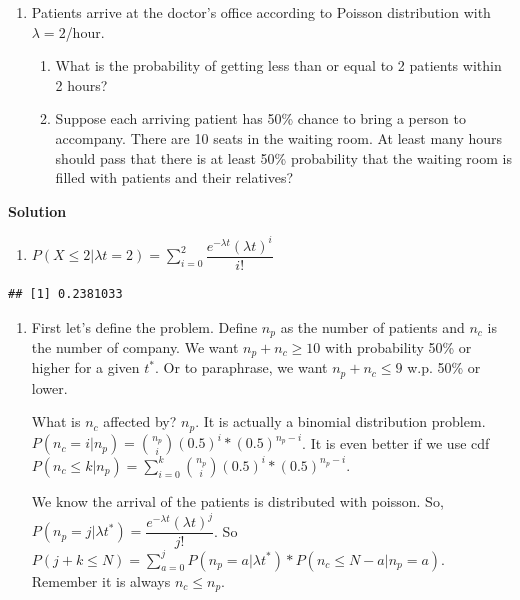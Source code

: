 \documentclass[]{book}
\providecommand{\tightlist}{%
  \setlength{\itemsep}{0pt}\setlength{\parskip}{0pt}}
\theoremstyle{definition}
\theoremstyle{definition}
\theoremstyle{definition}
\theoremstyle{remark}
\begin{document}
\begin{enumerate}
\def\labelenumi{\arabic{enumi}.}
\item
  Patients arrive at the doctor's office according to Poisson
  distribution with \(\lambda = 2\)/hour.

  \begin{enumerate}
  \def\labelenumii{\alph{enumii})}
  \tightlist
  \item
    What is the probability of getting less than or equal to 2 patients
    within 2 hours?
  \item
    Suppose each arriving patient has 50\% chance to bring a person to
    accompany. There are 10 seats in the waiting room. At least many
    hours should pass that there is at least 50\% probability that the
    waiting room is filled with patients and their relatives?
  \end{enumerate}
\end{enumerate}

\textbf{Solution}

\begin{enumerate}
\def\labelenumi{\alph{enumi})}
\tightlist
\item
  \(P(X\le 2|\lambda t = 2)= \sum_{i=0}^2 \dfrac{e^{-\lambda t}(\lambda t)^i}{i!}\)
\end{enumerate}

\begin{verbatim}
## [1] 0.2381033
\end{verbatim}

\begin{enumerate}
\def\labelenumi{\alph{enumi})}
\setcounter{enumi}{1}
\item
  First let's define the problem. Define \(n_p\) as the number of
  patients and \(n_c\) is the number of company. We want
  \(n_p + n_c \ge 10\) with probability 50\% or higher for a given
  \(t^*\). Or to paraphrase, we want \(n_p + n_c \le 9\) w.p. 50\% or
  lower.

  What is \(n_c\) affected by? \(n_p\). It is actually a binomial
  distribution problem.
  \(P(n_c = i|n_p) = \binom{n_p}{i} (0.5)^i*(0.5)^{n_p-i}\). It is even
  better if we use cdf
  \(P(n_c \le k|n_p) = \sum_{i=0}^{k} \binom{n_p}{i} (0.5)^i*(0.5)^{n_p-i}\).

  We know the arrival of the patients is distributed with poisson. So,
  \(P(n_p = j|\lambda t^*) = \dfrac{e^{-\lambda t}(\lambda t)^j}{j!}\).
  So
  \(P(j + k \le N) = \sum_{a=0}^j P(n_p = a|\lambda t^*)*P(n_c \le N-a | n_p = a)\).
  Remember it is always \(n_c \le n_p\).
\end{enumerate}
\end{document}
